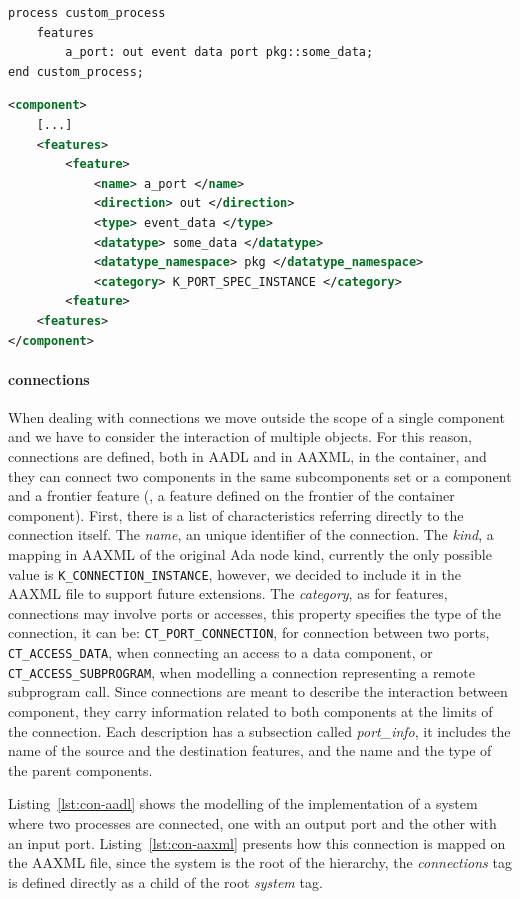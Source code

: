 \begin{lstlisting}[language=AADL,caption={TODO caption},label=lst:feature-aadl]
process custom_process
	features
		a_port: out event data port pkg::some_data;
end custom_process;
\end{lstlisting}

\begin{lstlisting}[language=XML,caption={TODO caption},label=lst:feature-aaxml]
<component>
	[...]
	<features>
		<feature>
			<name> a_port </name>
			<direction> out </direction>
			<type> event_data </type>
			<datatype> some_data </datatype>
			<datatype_namespace> pkg </datatype_namespace>
			<category> K_PORT_SPEC_INSTANCE </category>
		<feature>
	<features>
</component>
\end{lstlisting}

\paragraph{connections} When dealing with connections we move outside the scope of a single component and we have to consider the interaction of multiple objects. For this reason, connections are defined, both in AADL and in AAXML, in the container, and they can connect two components in the same subcomponents set or a component and a frontier feature (\ie, a feature defined on the frontier of the container component). First, there is a list of characteristics referring directly to the connection itself. The \textit{name}, an unique identifier of the connection. The \textit{kind}, a mapping in AAXML of the original Ada node kind, currently the only possible value is \texttt{K\_CONNECTION\_INSTANCE}, however, we decided to include it in the AAXML file to support future extensions. The \textit{category}, as for features, connections may involve ports or accesses, this property specifies the type of the connection, it can be: \texttt{CT\_PORT\_CONNECTION}, for connection between two ports, \texttt{CT\_ACCESS\_DATA}, when connecting an access to a data component, or \texttt{CT\_ACCESS\_SUBPROGRAM}, when modelling a connection representing a remote subprogram call. Since connections are meant to describe the interaction between component, they carry information related to both components at the limits of the connection. Each description has a subsection called \textit{port\_info}, it includes the name of the source and the destination features, and the name and the type of the parent components.

Listing~\ref{lst:con-aadl} shows the modelling of the implementation of a system where two processes are connected, one with an output port and the other with an input port. Listing~\ref{lst:con-aaxml} presents how this connection is mapped on the AAXML file, since the system is the root of the hierarchy, the \textit{connections} tag is defined directly as a child of the root \textit{system} tag.

